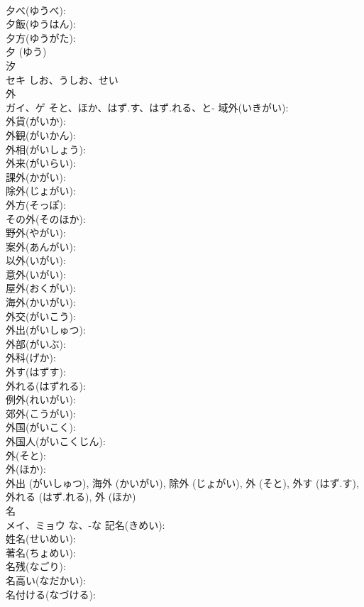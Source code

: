 \documentclass[8pt]{extreport}
\begin{document}
\begin{CJK}{UTF8}{min}
\\	夕べ(ゆうべ): 
\\	夕飯(ゆうはん): 
\\	夕方(ゆうがた): 
\\	夕 (ゆう)
\\	汐			
\\	セキ	しお、うしお、せい		
\\	外			
\\	ガイ、ゲ	そと、ほか、はず.す、はず.れる、と-	域外(いきがい): 
\\	外貨(がいか): 
\\	外観(がいかん): 
\\	外相(がいしょう): 
\\	外来(がいらい): 
\\	課外(かがい): 
\\	除外(じょがい): 
\\	外方(そっぽ): 
\\	その外(そのほか): 
\\	野外(やがい): 
\\	案外(あんがい): 
\\	以外(いがい): 
\\	意外(いがい): 
\\	屋外(おくがい): 
\\	海外(かいがい): 
\\	外交(がいこう): 
\\	外出(がいしゅつ): 
\\	外部(がいぶ): 
\\	外科(げか): 
\\	外す(はずす): 
\\	外れる(はずれる): 
\\	例外(れいがい): 
\\	郊外(こうがい): 
\\	外国(がいこく): 
\\	外国人(がいこくじん): 
\\	外(そと): 
\\	外(ほか): 
\\	外出 (がいしゅつ), 海外 (かいがい), 除外 (じょがい), 外 (そと), 外す (はず.す), 外れる (はず.れる), 外 (ほか)
\\	名			
\\	メイ、ミョウ	な、-な	記名(きめい): 
\\	姓名(せいめい): 
\\	著名(ちょめい): 
\\	名残(なごり): 
\\	名高い(なだかい): 
\\	名付ける(なづける): 

\end{CJK}
\end{document}
